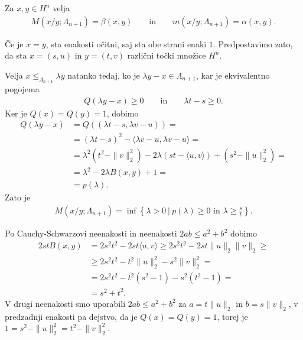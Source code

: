 \documentclass[mat2, tisk]{fmfdelo}
\begin{document}
\begin{izrek}\label{izr:lorentz_M_m_H}
Za $x,y\in H^n$ velja
\begin{align*}
M(x/y;\Lambda_{n+1})
=
\beta(x,y)
\qquad\text{in}\qquad
m(x/y;\Lambda_{n+1})
=
\alpha(x,y).
\end{align*}
\end{izrek}

\begin{dokaz}
Če je $x=y$, sta enakosti očitni, saj sta obe strani enaki $1$. Predpostavimo zato, da sta
$x=(s,u)$ in $y=(t,v)$ različni točki množice $H^n$.

Velja $x\leq_{\Lambda_{n+1}}\lambda y$ natanko tedaj, ko je
$\lambda y-x\in\Lambda_{n+1}$, kar je ekvivalentno pogojema
\begin{align*}
Q(\lambda y-x)\geq0
\qquad\text{in}\qquad
\lambda t-s\geq0.
\end{align*}
Ker je $Q(x)=Q(y)=1$, dobimo
\begin{align*}
Q(\lambda y-x)
&=
Q((\lambda t-s,\lambda v-u))=\\
&=
(\lambda t-s)^2
-
\langle\lambda v-u,\lambda v-u\rangle=\\
&=
\lambda^2(t^2-\|v\|_2^2)
-2\lambda(st-\langle u,v\rangle)
+(s^2-\|u\|_2^2)=\\
&=
\lambda^2-2\lambda B(x,y)+1=\\
&=
p(\lambda).
\end{align*}
Zato je
\begin{align}
M(x/y;\Lambda_{n+1})
=
\inf\limits
\left\{
\lambda>0 ~|~
p(\lambda)\geq0
\text{ in }
\lambda\geq\frac{s}{t}
\right\}.
\label{eq:lorentz_M}
\end{align}

Po Cauchy-Schwarzovi neenakosti in neenakosti
$2ab\leq a^2+b^2$ dobimo
\begin{align*}
2stB(x,y)
&=
2s^2t^2-2st\langle u,v\rangle \geq
2s^2t^2-2st\|u\|_2\|v\|_2 \geq \\
&\geq
2s^2t^2-t^2\|u\|_2^2-s^2\|v\|_2^2=\\
&=
2s^2t^2-t^2(s^2-1)-s^2(t^2-1)=\\
&=
s^2+t^2.
\end{align*}
V drugi neenakosti smo uporabili
$2ab\leq a^2+b^2$ za $a=t\|u\|_2$ in $b=s\|v\|_2$, v predzadnji enakosti pa dejstvo, da je $Q(x)=Q(y)=1$, 
torej je $1 = s^2 - \|u\|_2^2 = t^2 - \|v\|_2^2$.


\end{dokaz}
\end{document}
